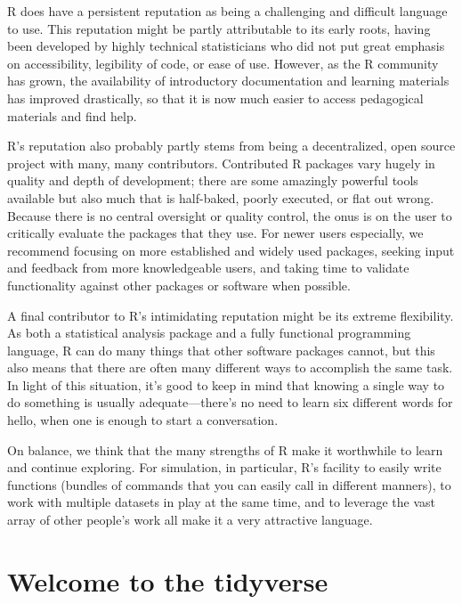 \documentclass[
]{book}
\begin{document}
R does have a persistent reputation as being a challenging and difficult language to use.
This reputation might be partly attributable to its early roots, having been developed by highly technical statisticians who did not put great emphasis on accessibility, legibility of code, or ease of use.
However, as the R community has grown, the availability of introductory documentation and learning materials has improved drastically, so that it is now much easier to access pedagogical materials and find help.

R's reputation also probably partly stems from being a decentralized, open source project with many, many contributors.
Contributed R packages vary hugely in quality and depth of development; there are some amazingly powerful tools available but also much that is half-baked, poorly executed, or flat out wrong.
Because there is no central oversight or quality control, the onus is on the user to critically evaluate the packages that they use.
For newer users especially, we recommend focusing on more established and widely used packages, seeking input and feedback from more knowledgeable users, and taking time to validate functionality against other packages or software when possible.

A final contributor to R's intimidating reputation might be its extreme flexibility.
As both a statistical analysis package and a fully functional programming language, R can do many things that other software packages cannot, but this also means that there are often many different ways to accomplish the same task.
In light of this situation, it's good to keep in mind that knowing a single way to do something is usually adequate---there's no need to learn six different words for hello, when one is enough to start a conversation.

On balance, we think that the many strengths of R make it worthwhile to learn and continue exploring. For simulation, in particular, R's facility to easily write functions (bundles of commands that you can easily call in different manners), to work with multiple datasets in play at the same time, and to leverage the vast array of other people's work all make it a very attractive language.

\section{Welcome to the tidyverse}\label{welcome-to-the-tidyverse}
\end{document}
